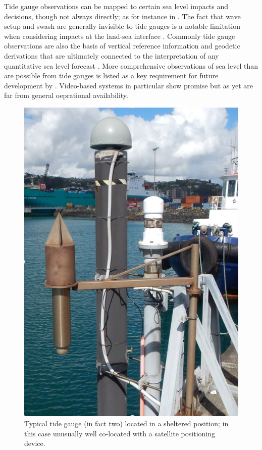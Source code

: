 Tide gauge observations can be mapped to certain sea level impacts and decisions, though not always directly; as for instance in \cite{Hague:2019ha}.    The fact that wave setup and swash are generally invisible to tide gauges is a notable limitation when considering impacts at the land-sea interface \citep{Serafin:2017fl}.
Commonly tide gauge observations are also the basis of vertical reference information and geodetic derivations that are ultimately connected to the interpretation of any quantitative sea level forecast \citep{Woppelmann:2006un}\citep{AVWS2021}.
More comprehensive observations of sea level than are possible from tide gauges is listed as a key requirement for future development by \citeauthor{10.3389/fmars.2019.00437}.    Video-based systems in particular show promise \citep{10.1175/jtech-d-18-0203.1}\cite{2018agufmep52d..26h} but as yet are far from general oeprational availability. 
\begin{figure}[H]\centering
  \includegraphics[width=\figwidthThird]{figures/images/tidegaugeEg.png}
  \caption{Typical tide gauge (in fact two) located in a sheltered position; in this case unusually well co-located with a satellite positioning device.}
  \label{fig:tidegauge}
\end{figure}


